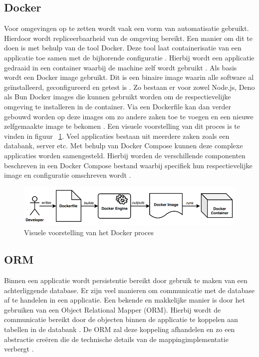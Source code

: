 \subsection{Docker}
Voor omgevingen op te zetten wordt vaak een vorm van automatisatie gebruikt. 
Hierdoor wordt repliceerbaarheid van de omgeving bereikt. Een manier om dit te doen is met behulp van de tool Docker.
Deze tool laat containerisatie van een applicatie toe samen met de bijhorende configuratie \autocite{Ibrahim2021}.
Hierbij wordt een applicatie gedraaid in een container waarbij de machine zelf wordt gebruikt \autocite{Boettiger2015}.
Als basis wordt een Docker image gebruikt. Dit is een binaire image waarin alle software al geïnstalleerd, geconfigureerd en getest is \autocite{Boettiger2015}.
Zo bestaan er voor zowel Node.js, Deno als Bun Docker images die kunnen gebruikt worden om de respectievelijke omgeving te installeren in de container.
Via een Dockerfile kan dan verder gebouwd worden op deze images om zo andere zaken toe te voegen en een nieuwe zelfgemaakte image te bekomen \autocite{Boettiger2015}.
Een visuele voorstelling van dit proces is te vinden in figuur ~\ref{fig:dockerproces}.
Veel applicaties bestaan uit meerdere zaken zoals een databank, server etc. 
Met behulp van Docker Compose kunnen deze complexe applicaties worden samengesteld. 
Hierbij worden de verschillende componenten beschreven in een Docker Compose bestand waarbij specifiek hun
respectievelijke image en configuratie omschreven wordt \autocite{Ibrahim2021}.
\begin{figure}[H]
    \centering
    \includegraphics[width=.9\textwidth]{graphics/docker_proces.png}
    \caption[Docker proces]{\label{fig:dockerproces}Visuele voorstelling van het Docker proces ~\autocite{Ibrahim2021}}
\end{figure}

\subsection{ORM}
Binnen een applicatie wordt persistentie bereikt door gebruik te maken van een achterliggende database. 
Er zijn veel manieren om communicatie met de database af te handelen in een applicatie.
Een bekende en makkelijke manier is door het gebruiken van een Object Relational Mapper (ORM).
Hierbij wordt de communicatie bereikt door de objecten binnen de applicatie te koppelen aan tabellen in de databank \autocite{Lorenz2017}.
De ORM zal deze koppeling afhandelen en zo een abstractie creëren die de technische details van de mappingimplementatie verbergt \autocite{Lorenz2017}.
